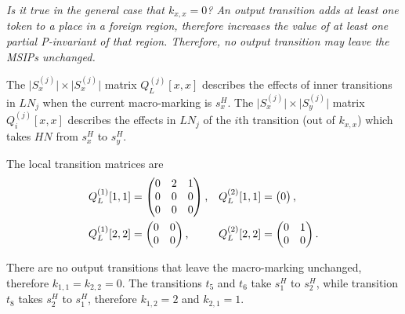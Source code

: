 \documentclass[a4paper,11pt,twoside,openright]{memoir}
\newcommand*{\LN}{\textit{LN}}
\newcommand*{\HN}{\textit{HN}}
\theoremstyle{my}
\begin{document}
\emph{Is it true in the general case that $k_{x,x} = 0$? An output
  transition adds at least one token to a place in a \emph{foreign}
  region, therefore increases the value of at least one partial
  P-invariant of that region. Therefore, no output transition may
  leave the MSIPs unchanged.}

The $\lvert S^{(j)}_{x} \rvert \times \lvert S^{(j)}_{x} \rvert$
matrix $Q^{(j)}_L[x, x]$ describes the effects of inner transitions in
$\LN_j$ when the current macro-marking is $s^H_x$. The
$\lvert S^{(j)}_{x} \rvert \times \lvert S^{(j)}_{y} \rvert$ matrix
$Q^{(j)}_i[x, x]$ describes the effects in $\LN_j$ of the $i$th
transition (out of $k_{x, x}$) which takes $\HN$ from $s^H_x$ to
$s^H_y$.

The local transition matrices are
\begin{align}
  Q^{(1)}_L[1, 1] &= \begin{pmatrix}
    0 & 2 & 1 \\
    0 & 0 & 0 \\
    0 & 0 & 0
  \end{pmatrix} \text,
  & Q^{(2)}_L[1, 1] &= \begin{pmatrix}
    0
  \end{pmatrix} \text, \\
  Q^{(1)}_L[2, 2] &= \begin{pmatrix}
    0 & 0 \\
    0 & 0
  \end{pmatrix} \text, &
  Q^{(2)}_L[2, 2] &= \begin{pmatrix}
    0 & 1 \\
    0 & 0
  \end{pmatrix} \text.
\end{align}

There are no output transitions that leave the macro-marking
unchanged, therefore $k_{1, 1} = k_{2, 2} = 0$. The transitions $t_5$
and $t_6$ take $s^H_1$ to $s^H_2$, while transition $t_8$ takes
$s^H_2$ to $s^H_1$, therefore $k_{1, 2} = 2$ and $k_{2, 1} = 1$.
\end{document}
